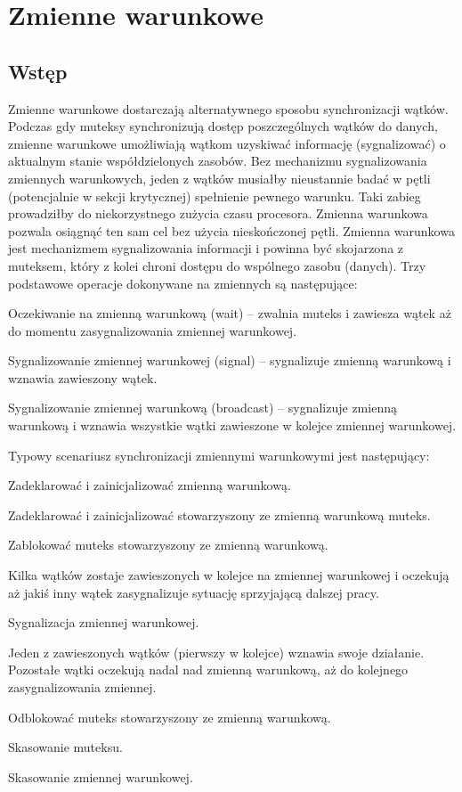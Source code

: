 \section{Zmienne warunkowe} 

\subsection{Wstęp}

Zmienne warunkowe dostarczają alternatywnego sposobu synchronizacji wątków. Podczas gdy muteksy synchronizują dostęp poszczególnych wątków do danych, zmienne warunkowe umożliwiają wątkom uzyskiwać informację (sygnalizować) o aktualnym stanie współdzielonych zasobów. Bez mechanizmu sygnalizowania zmiennych warunkowych, jeden z wątków musiałby nieustannie badać w pętli (potencjalnie w sekcji krytycznej) spełnienie pewnego warunku. Taki zabieg prowadziłby do niekorzystnego zużycia czasu procesora. Zmienna warunkowa pozwala osiągnąć ten sam cel bez użycia nieskończonej pętli. 
Zmienna warunkowa jest mechanizmem sygnalizowania informacji i powinna być skojarzona z muteksem, który z kolei chroni dostępu do wspólnego zasobu (danych). Trzy podstawowe operacje dokonywane na zmiennych są następujące: 

\begin{myitemize}
\item Oczekiwanie na zmienną warunkową (wait) – zwalnia muteks i zawiesza wątek aż do momentu zasygnalizowania zmiennej warunkowej.
\item Sygnalizowanie zmiennej warunkowej (signal) – sygnalizuje zmienną warunkową i wznawia zawieszony wątek.
\item Sygnalizowanie zmiennej warunkową (broadcast) – sygnalizuje zmienną warunkową i wznawia wszystkie wątki zawieszone w kolejce zmiennej warunkowej. 
\end{myitemize} 

Typowy scenariusz synchronizacji zmiennymi warunkowymi jest następujący: 
\begin{myitemize}
\item Zadeklarować i zainicjalizować zmienną warunkową.
\item Zadeklarować i zainicjalizować stowarzyszony ze zmienną warunkową muteks.
\item Zablokować muteks stowarzyszony ze zmienną warunkową.
\item Kilka wątków zostaje zawieszonych w kolejce na zmiennej warunkowej i oczekują aż jakiś inny wątek zasygnalizuje sytuację sprzyjającą dalszej pracy. 
\item Sygnalizacja zmiennej warunkowej. 
\item Jeden z zawieszonych wątków (pierwszy w kolejce) wznawia swoje działanie. Pozostałe wątki oczekują nadal nad zmienną warunkową, aż do kolejnego zasygnalizowania zmiennej.
\item Odblokować muteks stowarzyszony ze zmienną warunkową.
\item Skasowanie muteksu.
\item Skasowanie zmiennej warunkowej.
\end{myitemize}



\cleardoublepage
